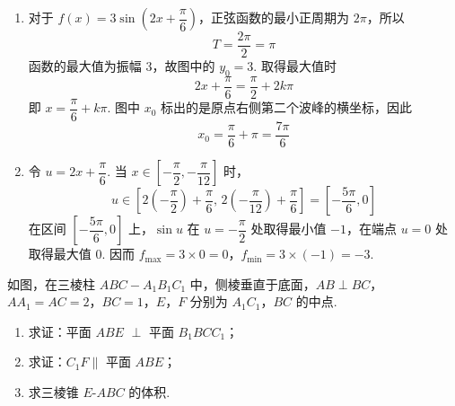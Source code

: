\begin{solution}
\begin{enumerate}
\item 对于 \(f(x)=3\sin\left(2x+\dfrac{\pi}{6}\right)\)，正弦函数的最小正周期为 \(2\pi\)，所以
\[
T=\frac{2\pi}{2}=\pi
\]
函数的最大值为振幅 \(3\)，故图中的 \(y_0=3\). 取得最大值时
\[
2x+\frac{\pi}{6}=\frac\pi2+2k\pi
\]
即 \(x=\dfrac\pi6+k\pi\). 图中 \(x_0\) 标出的是原点右侧第二个波峰的横坐标，因此
\[
x_0=\frac\pi6+\pi=\frac{7\pi}{6}
\]

\item 令 \(u=2x+\dfrac\pi6\). 当 \(x\in\left[-\dfrac\pi2,-\dfrac\pi{12}\right]\) 时，
\[
u\in\left[2\left(-\frac\pi2\right)+\frac\pi6,\,2\left(-\frac\pi{12}\right)+\frac\pi6\right]=\left[-\frac{5\pi}{6},0\right]
\]
在区间 \(\left[-\dfrac{5\pi}{6},0\right]\) 上，\(\sin u\) 在 \(u=-\dfrac\pi2\) 处取得最小值 \(-1\)，在端点 \(u=0\) 处取得最大值 \(0\). 因而
\(f_{\max}=3\times0=0\)，\(f_{\min}=3\times(-1)=-3\).
\end{enumerate}
\end{solution}

\begin{problem}
如图，在三棱柱 \(ABC - A_{1}B_{1}C_{1}\) 中，侧棱垂直于底面，\(AB \perp BC\)，\(AA_{1} = AC = 2\)，\(BC = 1\)，\(E\)，\(F\) 分别为 \(A_{1}C_{1}\)，\(BC\) 的中点.

\begin{enumerate}
\item 求证：平面 \(ABE\) \(\perp\) 平面 \(B_{1}BCC_{1}\)；
\item 求证：\(C_{1}F \parallel\) 平面 \(ABE\)；
\item 求三棱锥 \(E\text{-}ABC\) 的体积.
\end{enumerate}

\end{problem}

